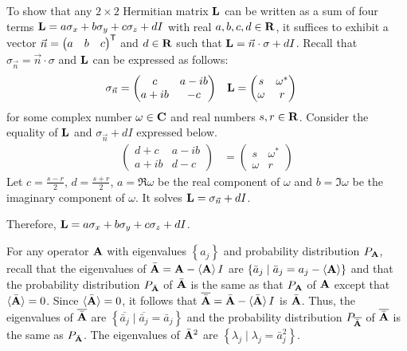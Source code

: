 \begin{answer}
	To show that any $2 \times 2$ Hermitian matrix $\mathbf{L}$ can be written as a sum of four terms $\mathbf{L} = a \sigma_x + b \sigma_y + c \sigma_z + dI$ with real $a,b,c,d \in \mathbf{R}$, it suffices to exhibit a vector $\vec{n} = \begin{pmatrix} a & b & c \end{pmatrix}^{\mathsf{T}}$ and $d \in \mathbf{R}$ such that $\mathbf{L} = \vec{n} \cdot \sigma + d I$.
	Recall that $\sigma_{\vec{n}} = \vec{n} \cdot \sigma$ and $\mathbf{L}$ can be expressed as follows:
	\begin{align}
		\sigma_{\vec{n}} & =
		\begin{pmatrix}
			c       & a - i b \\
			a + i b & -c
		\end{pmatrix}
		                 &
		\mathbf{L}              & =
		\begin{pmatrix}
			s      & \omega^* \\
			\omega & r
		\end{pmatrix}
	\end{align}
	for some complex number $\omega \in \mathbf{C}$ and real numbers $s, r \in \mathbf{R}$.
	Consider the equality of $\mathbf{L}$ and $\sigma_{\vec{n}} + dI$ expressed below.
	\begin{align*}
		\begin{pmatrix}
			d + c   & a - i b \\
			a + i b & d -c
		\end{pmatrix}
		 & =
		\begin{pmatrix}
			s      & \omega^* \\
			\omega & r
		\end{pmatrix}
	\end{align*}
	Let $c = \frac{s-r}{2}$, $d = \frac{s + r}{2}$, $a = \Re \omega$ be the real component of $\omega$ and $b = \Im \omega$ be the imaginary component of $\omega$.
	It solves $\mathbf{L} = \sigma_{\vec{n}} + dI$.

	Therefore, $\mathbf{L} = a \sigma_x + b \sigma_y + c \sigma_z + d I$.
\end{answer}

For any operator $\mathbf{A}$ with eigenvalues $\left\{a_j\right\}$ and probability distribution $P_{\mathbf{A}}$, recall that the eigenvalues of $\bar{\mathbf{A}} = \mathbf{A} - \braket{\mathbf{A}} I$ are $\left\{\bar{a}_j \mid \bar{a}_j = a_j - \braket{\mathbf{A}}\right\}$ and that the probability distribution $P_{\bar{\mathbf{A}}}$ of $\bar{\mathbf{A}}$ is the same as that $P_{\mathbf{A}}$ of $\mathbf{A}$ except that $\braket{\bar{\mathbf{A}}} = 0$.
Since $\braket{\bar{\mathbf{A}}} = 0$, it follows that $\overline{\bar{\mathbf{A}}} = \bar{\mathbf{A}} - \braket{\bar{\mathbf{A}}} I$ is $\bar{\mathbf{A}}$.
Thus, the eigenvalues of $\overline{\bar{\mathbf{A}}}$ are $\left\{\overline{\bar{a}_j} \mid \overline{\bar{a}_j} = \bar{a}_j\right\}$ and the probability distribution $P_{\overline{\bar{\mathbf{A}}}}$ of $\overline{\bar{\mathbf{A}}}$ is the same as $P_{\bar{\mathbf{A}}}$.
The eigenvalues of $\bar{\mathbf{A}}^2$ are $\left\{\lambda_j \mid \lambda_j = \bar{a}_j^2\right\}$.

